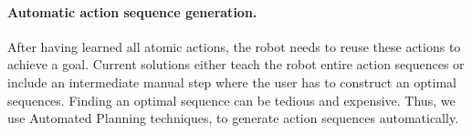 \paragraph{Automatic action sequence generation.}
After having learned all atomic actions, the robot needs to reuse these actions to achieve a goal.
Current solutions either teach the robot entire action sequences or include an intermediate manual step where the user has to construct an optimal sequences.
Finding an optimal sequence can be tedious and expensive.
Thus, we use Automated Planning techniques, to generate action sequences automatically.
